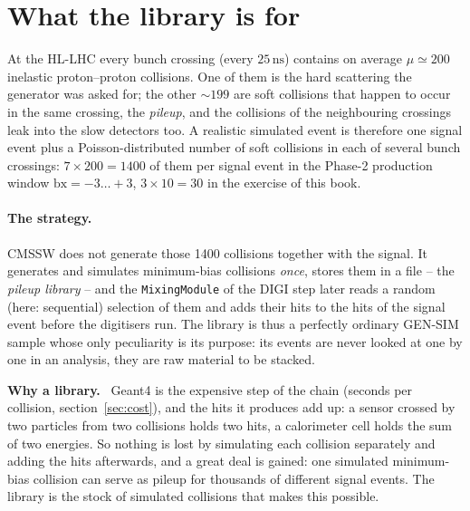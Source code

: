 \documentclass[11pt,a4paper]{article}
\newcommand{\code}[1]{\texttt{#1}}
\newcommand{\bx}{\ensuremath{\mathrm{bx}}}
\newcommand{\ns}{\,\mathrm{ns}}
\newenvironment{plainwords}[1][In plain words]{%
  \par\medskip\noindent\setlength{\fboxsep}{6pt}\setlength{\fboxrule}{0.6pt}%
  \begin{lrbox}{\plainbox}\begin{minipage}{\dimexpr\textwidth-2\fboxsep-2\fboxrule\relax}\small
  \textbf{\textcolor{plainrule}{#1.}}\ \ignorespaces}{%
  \end{minipage}\end{lrbox}\noindent\fcolorbox{plainrule}{plainbg}{\usebox{\plainbox}}\par\medskip}
\begin{document}
\section{What the library is for}
\label{sec:why}

At the HL-LHC every bunch crossing (every $25\ns$) contains on average $\mu\simeq200$ inelastic
proton--proton collisions. One of them is the hard scattering the generator was asked for; the other
$\sim199$ are soft collisions that happen to occur in the same crossing, the \emph{pileup}, and the
collisions of the neighbouring crossings leak into the slow detectors too. A realistic simulated event is
therefore one signal event plus a Poisson-distributed number of soft collisions in each of several bunch
crossings: $7\times200 = 1400$ of them per signal event in the Phase-2 production window $\bx=-3\ldots+3$,
$3\times10=30$ in the exercise of this book.

\paragraph{The strategy.} CMSSW does not generate those 1400 collisions together with the signal. It
generates and simulates minimum-bias collisions \emph{once}, stores them in a file -- the \emph{pileup
library} -- and the \code{MixingModule} of the DIGI step later reads a random (here: sequential) selection
of them and adds their hits to the hits of the signal event before the digitisers run. The library is thus a
perfectly ordinary GEN-SIM sample whose only peculiarity is its purpose: its events are never looked at one
by one in an analysis, they are raw material to be stacked.

\begin{plainwords}[Why a library]
Geant4 is the expensive step of the chain (seconds per collision, section~\ref{sec:cost}), and the hits it
produces add up: a sensor crossed by two particles from two collisions holds two hits, a calorimeter cell
holds the sum of two energies. So nothing is lost by simulating each collision separately and adding the
hits afterwards, and a great deal is gained: one simulated minimum-bias collision can serve as pileup for
thousands of different signal events. The library is the stock of simulated collisions that makes this
possible.
\end{plainwords}
\end{document}

